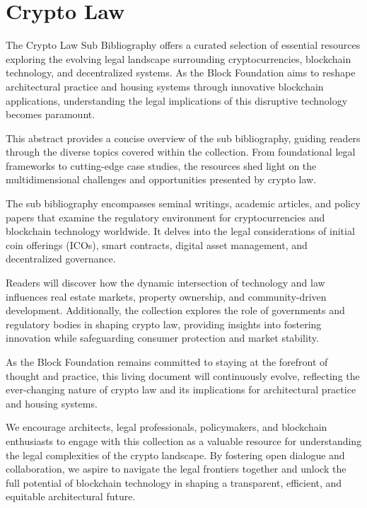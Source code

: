 \newpage
\section{Crypto Law}



The Crypto Law Sub Bibliography offers a curated selection of essential resources exploring the evolving legal landscape surrounding cryptocurrencies, blockchain technology, and decentralized systems. As the Block Foundation aims to reshape architectural practice and housing systems through innovative blockchain applications, understanding the legal implications of this disruptive technology becomes paramount.

This abstract provides a concise overview of the sub bibliography, guiding readers through the diverse topics covered within the collection. From foundational legal frameworks to cutting-edge case studies, the resources shed light on the multidimensional challenges and opportunities presented by crypto law.

The sub bibliography encompasses seminal writings, academic articles, and policy papers that examine the regulatory environment for cryptocurrencies and blockchain technology worldwide. It delves into the legal considerations of initial coin offerings (ICOs), smart contracts, digital asset management, and decentralized governance.

Readers will discover how the dynamic intersection of technology and law influences real estate markets, property ownership, and community-driven development. Additionally, the collection explores the role of governments and regulatory bodies in shaping crypto law, providing insights into fostering innovation while safeguarding consumer protection and market stability.

As the Block Foundation remains committed to staying at the forefront of thought and practice, this living document will continuously evolve, reflecting the ever-changing nature of crypto law and its implications for architectural practice and housing systems.

We encourage architects, legal professionals, policymakers, and blockchain enthusiasts to engage with this collection as a valuable resource for understanding the legal complexities of the crypto landscape. By fostering open dialogue and collaboration, we aspire to navigate the legal frontiers together and unlock the full potential of blockchain technology in shaping a transparent, efficient, and equitable architectural future.




